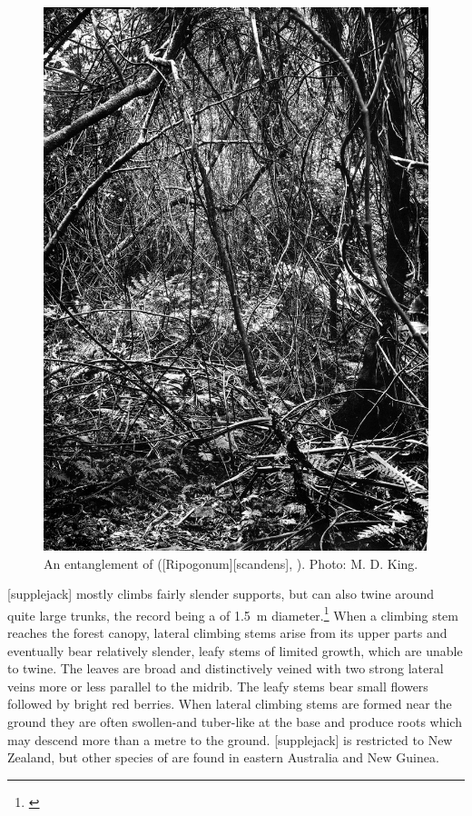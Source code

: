 \begin{figure}[t]
\begin{minipage}[t]{\textwidth}
\begin{minipage}[t]{(\textwidth-\fgap) * \real{0.488}}
			\includegraphics[width=\textwidth]{graphics/figure33supplejack.jpg}
			\caption[An entanglement of supplejack]{An entanglement of  ([Ripogonum][scandens], ). Photo:  M. D. King.}%
			\label{fig:33supplejack}
		\end{minipage}
	\end{minipage}
\end{figure}

[supplejack] mostly climbs fairly slender supports, but can also twine around quite large trunks, the record being a  of \SI{1.5}{\metre} diameter.\footnote{\cite{macmillan1973biological}}
When a climbing stem reaches the forest canopy, lateral climbing stems arise from its upper parts and eventually bear relatively slender, leafy stems of limited growth, which are unable to twine.
The leaves are broad and distinctively veined with two strong lateral veins more or less parallel to the midrib.
The leafy stems bear small flowers followed by bright red berries.
When lateral climbing stems are formed near the ground they are often swollen-and tuber-like at the base and produce roots which may descend more than a metre to the ground.
[supplejack] is restricted to New Zealand, but other species of  are found in eastern Australia and New Guinea.

